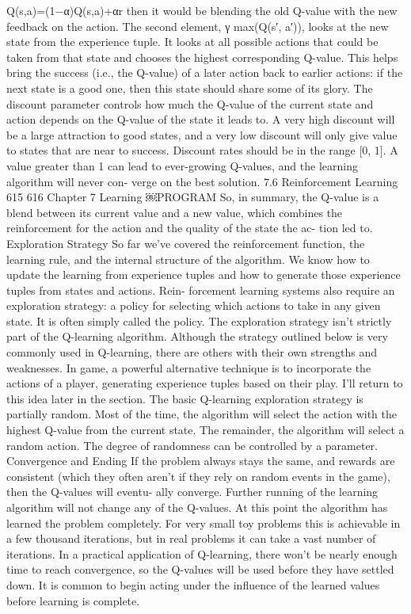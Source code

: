\documentclass[a4paper,oneside]{report}
\begin{document}
Q(s,a)=(1−α)Q(s,a)+αr
then it would be blending the old Q-value with the new feedback on the action.
The second element, γ max(Q(s′, a′)), looks at the new state from the experience tuple. It looks at all possible actions that could be taken from that state and chooses the highest corresponding Q-value. This helps bring the success (i.e., the Q-value) of a later action back to earlier actions: if the next state is a good one, then this state
should share some of its glory.
The discount parameter controls how much the Q-value of the current state and
action depends on the Q-value of the state it leads to. A very high discount will be a large attraction to good states, and a very low discount will only give value to states that are near to success. Discount rates should be in the range [0, 1]. A value greater than 1 can lead to ever-growing Q-values, and the learning algorithm will never con- verge on the best solution.
7.6 Reinforcement Learning 615
616 Chapter 7 Learning
￼PROGRAM
So, in summary, the Q-value is a blend between its current value and a new value, which combines the reinforcement for the action and the quality of the state the ac- tion led to.
Exploration Strategy
So far we’ve covered the reinforcement function, the learning rule, and the internal structure of the algorithm. We know how to update the learning from experience tuples and how to generate those experience tuples from states and actions. Rein- forcement learning systems also require an exploration strategy: a policy for selecting which actions to take in any given state. It is often simply called the policy.
The exploration strategy isn’t strictly part of the Q-learning algorithm. Although the strategy outlined below is very commonly used in Q-learning, there are others with their own strengths and weaknesses. In game, a powerful alternative technique is to incorporate the actions of a player, generating experience tuples based on their play. I’ll return to this idea later in the section.
The basic Q-learning exploration strategy is partially random. Most of the time, the algorithm will select the action with the highest Q-value from the current state. The remainder, the algorithm will select a random action. The degree of randomness can be controlled by a parameter.
Convergence and Ending
If the problem always stays the same, and rewards are consistent (which they often aren’t if they rely on random events in the game), then the Q-values will eventu- ally converge. Further running of the learning algorithm will not change any of the Q-values. At this point the algorithm has learned the problem completely.
For very small toy problems this is achievable in a few thousand iterations, but in real problems it can take a vast number of iterations. In a practical application of Q-learning, there won’t be nearly enough time to reach convergence, so the Q-values will be used before they have settled down. It is common to begin acting under the influence of the learned values before learning is complete.
\end{document}
